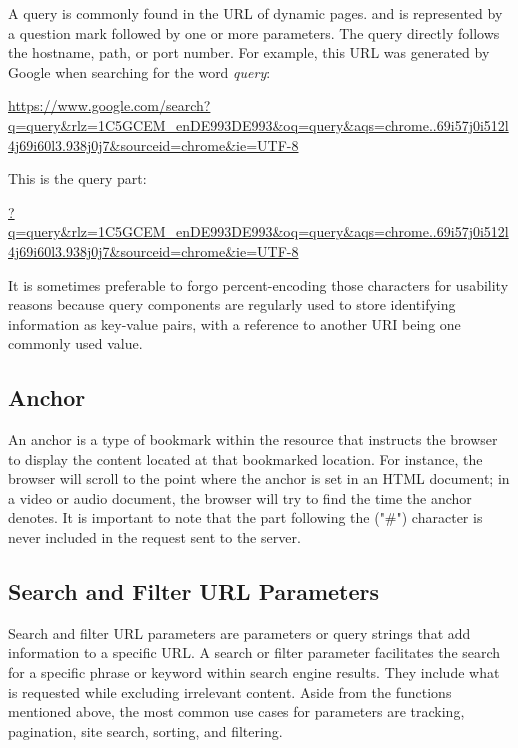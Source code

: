 A query is commonly found in the URL of dynamic pages. and is represented by a question mark followed by one or more parameters. The query directly follows the hostname, path, or port number. For example, this URL was generated by Google when searching for the word \emph{query}:

\begin{center}
  \url{https://www.google.com/search?q=query&rlz=1C5GCEM_enDE993DE993&oq=query&aqs=chrome..69i57j0i512l4j69i60l3.938j0j7&sourceid=chrome&ie=UTF-8}
\end{center}

\noindent This is the query part:

\begin{center}
  \url{?q=query&rlz=1C5GCEM_enDE993DE993&oq=query&aqs=chrome..69i57j0i512l4j69i60l3.938j0j7&sourceid=chrome&ie=UTF-8}
\end{center}

It is sometimes preferable to forgo percent-encoding those characters for usability reasons because query components are regularly used to store identifying information as key-value pairs, with a reference to another URI being one commonly used value.

\subsection*{Anchor}
An anchor is a type of bookmark within the resource that instructs the browser to display the content located at that bookmarked location. For instance, the browser will scroll to the point where the anchor is set in an HTML document; in a video or audio document, the browser will try to find the time the anchor denotes. It is important to note that the part following the ("\#") character is never included in the request sent to the server.

\subsection{Search and Filter URL Parameters}
Search and filter URL parameters are parameters or query strings that add information to a specific URL. A search or filter parameter facilitates the search for a specific phrase or keyword within search engine results. They include what is requested while excluding irrelevant content. Aside from the functions mentioned above, the most common use cases for parameters are tracking, pagination, site search, sorting, and filtering.


